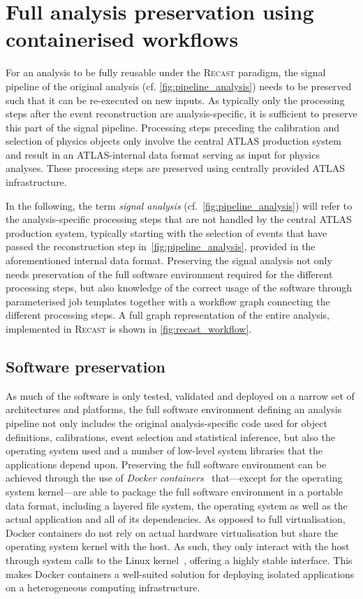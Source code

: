 \section{Full analysis preservation using containerised workflows}\label{sec:recast_implementation}

For an analysis to be fully reusable under the \textsc{Recast} paradigm, the signal pipeline of the original analysis (cf. \cref{fig:pipeline_analysis}) needs to be preserved such that it can be re-executed on new inputs. As typically only the processing steps after the event reconstruction are analysis-specific, it is sufficient to preserve this part of the signal pipeline. Processing steps preceding the calibration and selection of physics objects only involve the central ATLAS production system and result in an ATLAS-internal data format serving as input for physics analyses. These processing steps are preserved using centrally provided ATLAS infrastructure.

 In the following, the term \textit{signal analysis} (cf.~\cref{fig:pipeline_analysis}) will refer to the analysis-specific processing steps that are not handled by the central ATLAS production system, typically starting with the selection of events that have passed the reconstruction step in~\cref{fig:pipeline_analysis}, provided in the aforementioned internal data format. Preserving the signal analysis not only needs preservation of the full software environment required for the different processing steps, but also knowledge of the correct usage of the software through parameterised job templates together with a workflow graph connecting the different processing steps. A full graph representation of the entire analysis, implemented in \textsc{Recast} is shown in \cref{fig:recast_workflow}.

\subsection{Software preservation}

As much of the software is only tested, validated and deployed on a narrow set of architectures and platforms, the full software environment defining an analysis pipeline not only includes the original analysis-specific code used for object definitions, calibrations, event selection and statistical inference, but also the operating system used and a number of low-level system libraries that the applications depend upon.
Preserving the full software environment can be achieved through the use of \textit{Docker containers}~\cite{docker,Binet:2134524} that---except for the operating system kernel---are able to package the full software environment in a portable data format, including a layered file system, the operating system as well as the actual application and all of its dependencies.
As opposed to full virtualisation, Docker containers do not rely on actual hardware virtualisation but share the operating system kernel with the host. As such, they only interact with the host through system calls to the Linux kernel~\cite{Binet:2134524}, offering a highly stable interface. This makes Docker containers a well-suited solution for deploying isolated applications on a heterogeneous computing infrastructure.

